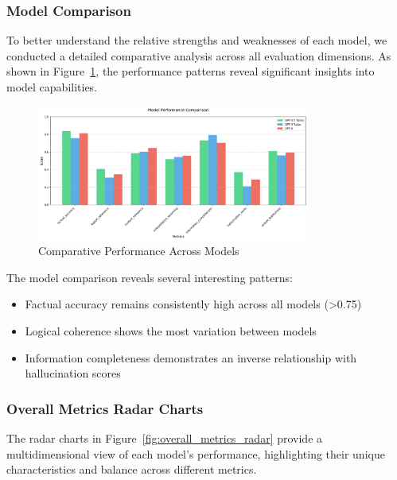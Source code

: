 \subsubsection{Model Comparison}
To better understand the relative strengths and weaknesses of each model, we conducted a detailed comparative analysis across all evaluation dimensions. As shown in Figure~\ref{fig:model_comparison}, the performance patterns reveal significant insights into model capabilities.

\begin{figure}[!htbp]
\centering
\includegraphics[width=0.8\textwidth]{figures/overall/model_comparison.png}
\caption{Comparative Performance Across Models}
\label{fig:model_comparison}
\end{figure}

The model comparison reveals several interesting patterns:
\begin{itemize}
    \item Factual accuracy remains consistently high across all models (>0.75)
    \item Logical coherence shows the most variation between models
    \item Information completeness demonstrates an inverse relationship with hallucination scores
\end{itemize}

\subsubsection{Overall Metrics Radar Charts}
The radar charts in Figure~\ref{fig:overall_metrics_radar} provide a multidimensional view of each model's performance, highlighting their unique characteristics and balance across different metrics.


